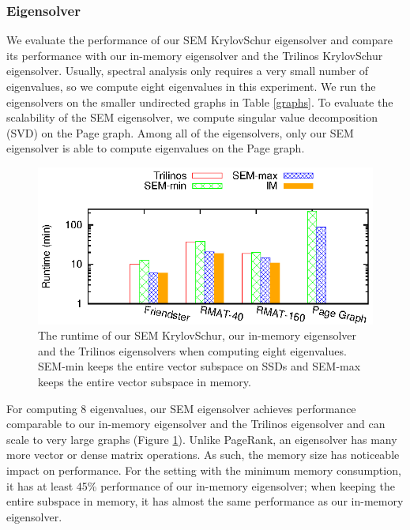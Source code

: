 \subsubsection{Eigensolver}

We evaluate the performance of our SEM KrylovSchur eigensolver and compare
its performance
with our in-memory eigensolver and the Trilinos KrylovSchur eigensolver.
Usually, spectral analysis only requires a very small number of
eigenvalues, so we compute eight eigenvalues in this experiment. We run
the eigensolvers on the smaller undirected graphs
in Table \ref{graphs}. To evaluate the scalability of the SEM eigensolver,
we compute singular value decomposition (SVD) on the Page graph. Among all of
the eigensolvers, only our SEM eigensolver is able to compute eigenvalues
on the Page graph.

\begin{figure}
	\begin{center}
		\footnotesize
		\includegraphics[scale=1]{SpMM_figs/eigen-runtime-8ev.eps}
		\caption{The runtime of our SEM KrylovSchur, our in-memory eigensolver
			and the Trilinos eigensolvers when computing eight
			eigenvalues. SEM-min keeps the entire vector subspace on SSDs and
		SEM-max keeps the entire vector subspace in memory.}
		\label{fig:eigen}
	\end{center}
\end{figure}

For computing 8 eigenvalues, our SEM eigensolver achieves performance
comparable to our in-memory eigensolver and the Trilinos eigensolver
and can scale to very large graphs (Figure \ref{fig:eigen}).
Unlike PageRank, an eigensolver has many more vector or dense matrix operations.
As such, the memory size has noticeable impact on performance.
For the setting with the minimum memory consumption, it has at least 45\%
performance of our in-memory eigensolver; when keeping the entire subspace
in memory, it has almost the same performance as our in-memory eigensolver.

